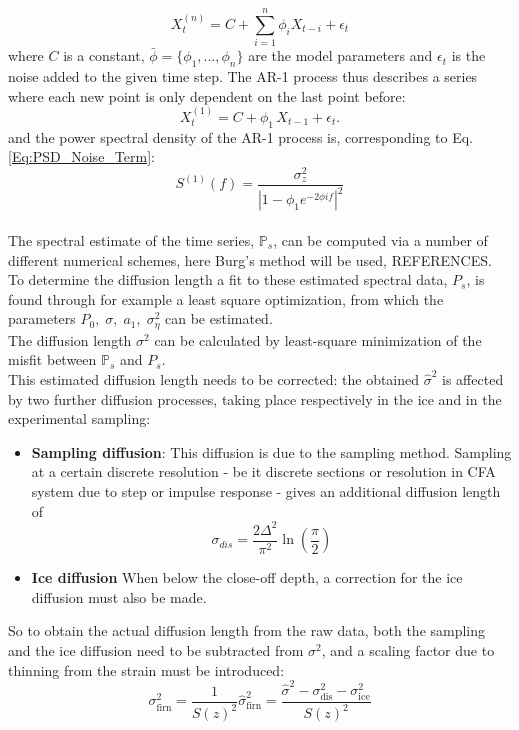 \documentclass[../../CompleteThesis2/Complete_2ndDraft]{subfiles}
\begin{document}
\begin{equation}
	X_t^{(n)} = C + \sum_{i=1}^{n}\phi_i X_{t-i} + \epsilon_t
	\label{Eq:AR-n}
\end{equation}
where $C$ is a constant, $\bar{\phi} = \{\phi_1,...,\phi_{n}\}$ are the model parameters and $\epsilon_t$ is the noise added to the given time step. The AR-1 process thus describes a series where each new point is only dependent on the last point before:
\begin{equation}
	X_t^{(1)} = C + \phi_{1}\, X_{t-1} + \epsilon_t.
	\label{Eq:AR-1}
\end{equation} 
and the power spectral density of the AR-1 process is, corresponding to Eq. \ref{Eq:PSD_Noise_Term}:
\begin{equation}
	S^{(1)}(f) = \frac{\sigma_z^2}{|1 - \phi_{1}e^{-2\phi i f}|^2}
\end{equation}\\
The spectral estimate of the time series, $\mathbb{P}_s$, can be computed via a number of different numerical schemes, here Burg's method will be used, REFERENCES. To determine the diffusion length a fit to these estimated spectral data, $P_s$, is found through for example a least square optimization, from which the parameters $P_0, \; \sigma, \; a_1, \; \sigma_{\eta}^2$ can be estimated.\\
The diffusion length $\sigma^2$ can be calculated by least-square minimization of the misfit between $\mathbb{P}_s$ and $P_s$.\\
This estimated diffusion length needs to be corrected: the obtained $\hat{\sigma}^2$ is affected by two further diffusion processes, taking place respectively in the ice and in the experimental sampling:
\begin{itemize}
	\item \textbf{Sampling diffusion}: This diffusion is due to the sampling method. Sampling at a certain discrete resolution - be it discrete sections or resolution in CFA system due to step or impulse response - gives an additional diffusion length of
	\begin{equation}
		\sigma_{dis} = \frac{2 \Delta^2}{\pi^2}\ln\left(\frac{\pi}{2}\right)
		\label{Eq:Diff_Len_corr_Discrete}
	\end{equation}
	\item \textbf{Ice diffusion} When below the close-off depth, a correction for the ice diffusion must also be made.
\end{itemize} 

So to obtain the actual diffusion length from the raw data, both the sampling and the ice diffusion need to be subtracted from $\sigma^2$, and a scaling factor due to thinning from the strain must be introduced:
\begin{equation}
	\sigma_{\text{firn}}^2 = \frac{1}{S(z)^2}\hat{\sigma}_{\text{firn}}^2 = \frac{\hat{\sigma}^2 - \sigma_{\text{dis}}^2 - \sigma_{\text{ice}}^2}{S(z)^2}
	\label{Eq:Diff_Len_Firn_Corrected}
\end{equation}
\end{document}

